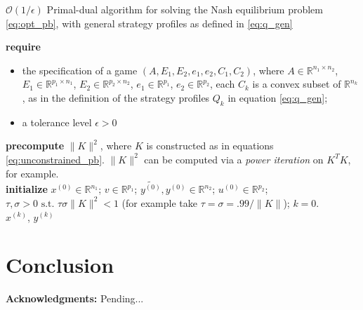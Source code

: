 \documentclass{article} %
\begin{document}
\begin{algorithm}[htb]
  \caption{$\mathcal{O}(1/\epsilon)$ Primal-dual algorithm for solving the Nash equilibrium problem \eqref{eq:opt_pb}, with general strategy profiles as defined in \eqref{eq:q_gen}}
  \textbf{require}
  \begin{itemize}
    \item the specification of a game $(A, E_1, E_2, e_1, e_2, C_1, C_2)$, where $A \in \mathbb{R}^{n_1 \times n_2}$,
  $E_1 \in \mathbb{R}^{p_1 \times n_1}$, $E_2 \in \mathbb{R}^{p_2 \times n_2}$, $e_1 \in \mathbb{R}^{p_1}$, $e_2 \in \mathbb{R}^{p_2}$, each $C_k$ is a convex subset of $\mathbb{R}^{n_k}$, as in the definition of the strategy profiles $Q_k$ in equation \eqref{eq:q_gen};
      \item a tolerance level $\epsilon > 0$
  \end{itemize}
  \textbf{precompute} $\|K\|^2$, where $K$ is constructed as in equations \eqref{eq:unconstrained_pb}. $\|K\|^2$ can be computed via a \textit{power iteration} on $K^TK$, for example.\\
  \textbf{initialize}
  $x^{(0)} \in \mathbb{R}^{n_1}$; $v \in \mathbb{R}^{p_1}$; $\tilde{y^{(0)}}, y^{(0)} \in \mathbb{R}^{n_2}$; $u^{(0)} \in \mathbb{R}^{p_2}$; 
  $\tau, \sigma > 0 \text{ s.t. }\tau\sigma \|K\|^2 < 1$ (for example take $\tau = \sigma = .99/\|K\|$); $k = 0$.\\
   \Return $x^{(k)}$, $y^{(k)}$
  \label{Tab:algo}
\end{algorithm}

\section{Conclusion}
\medskip \noindent
\textbf{Acknowledgments:}
Pending...

\small


\end{document}
